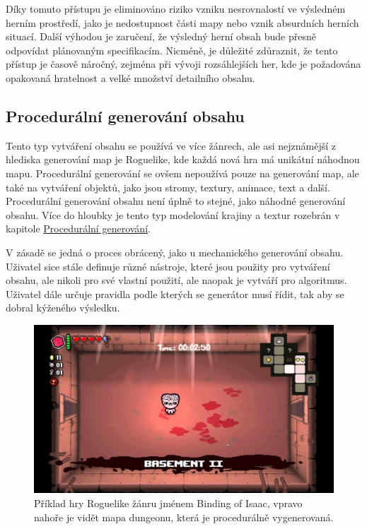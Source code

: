 Díky tomuto přístupu je eliminováno riziko vzniku nesrovnalostí ve výsledném herním prostředí, jako je nedostupnost části mapy nebo vznik absurdních herních situací. Další výhodou je zaručení, že výsledný herní obsah bude přesně odpovídat plánovaným specifikacím. Nicméně, je důležité zdůraznit, že tento přístup je časově náročný, zejména při vývoji rozsáhlejších her, kde je požadována opakovaná hratelnost a velké množství detailního obsahu.

\subsection{Procedurální generování obsahu}
Tento typ vytváření obsahu se používá ve více žánrech, ale asi nejznámější z hlediska generování map je Roguelike, kde každá nová hra má unikátní náhodnou mapu. Procedurální generování se ovšem nepoužívá pouze na generování map, ale také na vytváření objektů, jako jsou stromy, textury, animace, text a další. Procedurální generování obsahu není úplně to stejné, jako náhodné generování obsahu. Více do hloubky je tento typ modelování krajiny a textur rozebrán v kapitole \hyperref[procedural]{Procedurální generování}.

V zásadě se jedná o proces obrácený, jako u mechanického generování obsahu. Uživatel sice stále definuje různé nástroje, které jsou použity pro vytváření obsahu, ale nikoli pro své vlastní použití, ale naopak je vytváří pro algoritmus. Uživatel dále určuje pravidla podle kterých se generátor musí řídit, tak aby se dobral kýženého výsledku.

\begin{figure}[H]
	\centering
	\includegraphics[scale=0.33]{obrazky-figures/BindingOfIsaac.jpg}
	\caption{Příklad hry Roguelike žánru jménem Binding of Isaac, vpravo nahoře je vidět mapa dungeonu, která je procedurálně vygenerovaná.}
\end{figure}

